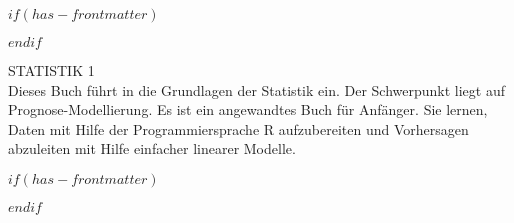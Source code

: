 
$if(has-frontmatter)$
  \begin{frontmatter}
$endif$



\begin{titlepage}
    \centering
    \vspace*{3cm}
    {\Huge STATISTIK 1\\}
    \vspace*{2cm}
    \noindent %
Dieses Buch führt in die Grundlagen der Statistik ein.
Der Schwerpunkt liegt auf Prognose-Modellierung.
Es ist ein angewandtes Buch für Anfänger.
Sie lernen, Daten mit Hilfe der Programmiersprache R aufzubereiten 
und Vorhersagen abzuleiten mit Hilfe einfacher linearer Modelle.    

    \vfill
\end{titlepage}


\newpage
\null
\thispagestyle{empty} %
\newpage



\setcounter{page}{1}
$if(has-frontmatter)$
\end{frontmatter}
$endif$


